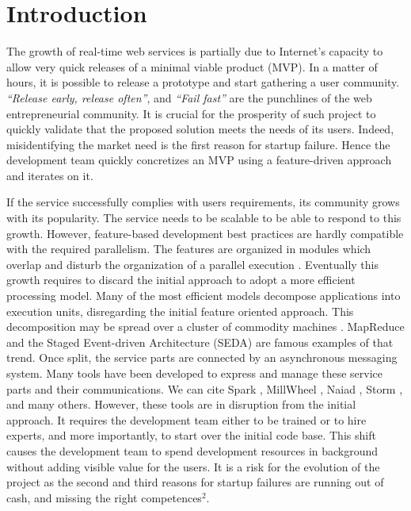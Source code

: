 \section{Introduction}

The growth of real-time web services is partially due to Internet's capacity to allow very quick releases of a minimal viable product (MVP).
In a matter of hours, it is possible to release a prototype and start gathering a user community.
\textit{``Release early, release often''}, and \textit{``Fail fast''} are the punchlines of the web entrepreneurial community.
It is crucial for the prosperity of such project to quickly validate that the proposed solution meets the needs of its users.
Indeed, misidentifying the market need is the first reason for startup failure.
Hence the development team quickly concretizes an MVP using a feature-driven approach and iterates on it.

If the service successfully complies with users requirements, its community grows with its popularity.
The service needs to be scalable to be able to respond to this growth.
However, feature-based development best practices are hardly compatible with the required parallelism.
The features are organized in modules which overlap and disturb the organization of a parallel execution \cite{Clements2013a,Hughes1989,Parnas1972}.
Eventually this growth requires to discard the initial approach to adopt a more efficient processing model.
Many of the most efficient models decompose applications into execution units, disregarding the initial feature oriented approach.
This decomposition may be spread over a cluster of commodity machines \cite{Fox1997}.
MapReduce \cite{Dean2008} and the Staged Event-driven Architecture (SEDA) \cite{Welsh2000} are famous examples of that trend. %
Once split, the service parts are connected by an asynchronous messaging system.
Many tools have been developed to express and manage these service parts and their communications.
We can cite Spark \cite{Zaharia2012}, MillWheel \cite{Akidau2013}, Naiad \cite{McSherry}, Storm \cite{Toshniwal2014}, and many others.
However, these tools are in disruption from the initial approach.
It requires the development team either to be trained or to hire experts, and more importantly, to start over the initial code base.
This shift causes the development team to spend development resources in background without adding visible value for the users.
It is a risk for the evolution of the project as the second and third reasons for startup failures are running out of cash, and missing the right competences$^2$.

